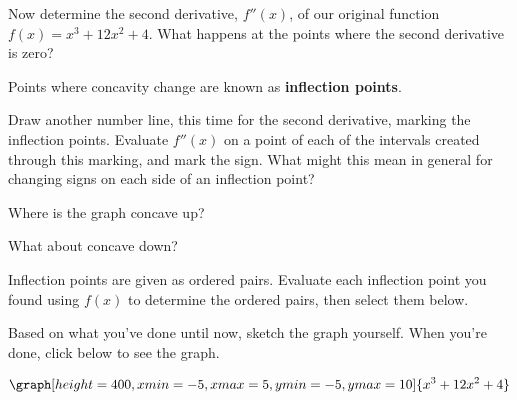 \documentclass{ximera}
\begin{document}
\begin{question}

Now determine the second derivative, $f''(x)$, of our original function $f(x) = x^3 + 12x^2+4$. What happens at the points where the second derivative is zero?

\begin{multipleChoice}
\end{multipleChoice}
\vspace{10mm}

Points where concavity change are known as \textbf{inflection points}.

Draw another number line, this time for the second derivative, marking the inflection points. Evaluate $f''(x)$ on a point of each of the intervals created through this marking, and mark the sign. What might this mean in general for changing signs on each side of an inflection point?

\begin{selectAll}
\end{selectAll}
\vspace{5mm}
Where is the graph concave up?
\begin{multipleChoice}
\choice{$[0,1]$}
\choice[correct]{$[-4, \infty)$}
\choice{$(-\infty, 0]$}
\choice{$[0,260]$}
\choice{$[4,260]$}
\end{multipleChoice}
\vspace{5mm}
What about concave down?

\begin{multipleChoice}
\choice{$[0,1]$}
\choice{$[-4, \infty)$}
\choice[correct]{$(-\infty, -4]$}
\choice{$[0,260]$}
\choice{$[4,260]$}
\end{multipleChoice}
\vspace{5mm}

Inflection points are given as ordered pairs. Evaluate each inflection point you found using $f(x)$ to determine the ordered pairs, then select them below.
\begin{selectAll}
\end{selectAll}
\vspace{5mm}
Based on what you've done until now, sketch the graph yourself. When you're done, click below to see the graph.

\begin{multipleChoice}
\end{multipleChoice}
\begin{feedback}
\[
\graph[height=400,xmin=-5,xmax=5,ymin=-5,ymax=10]{x^3+12x^2+4}
\]
\end{feedback}
\end{question}
\end{document}
